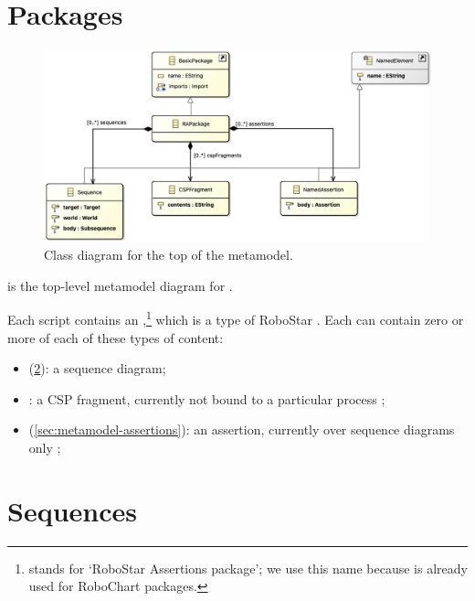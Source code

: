 
\section{Packages}\label{sec:metamodel-top}

\begin{figure}
	\centering
	\includegraphics[width=.85\textwidth]{diagrams/top.png}
	\caption{Class diagram for the top of the \langname{} metamodel.}
	\label{fig:metamodel-top}
\end{figure}

 is the top-level metamodel diagram for \langname.

Each \langname{} script contains an \mrapackage,\footnote{\mrapackage{} stands
for `RoboStar Assertions package'; we use this name because \mrcpackage{} is
already used for RoboChart packages.}
which is a type of RoboStar \mbasicpackage.
Each \mrapackage{} can contain zero or more of each of these types of content:

\begin{itemize}
\item
	\msequence{}
	(\cref{sec:metamodel-sequences}):
	a sequence diagram;
\item
	\mcspfragment:
	a CSP fragment, currently not bound to a particular process
	;
\item
	\massertion{}
	(\cref{sec:metamodel-assertions}):
	an assertion, currently over sequence diagrams only
	;
\end{itemize}



\section{Sequences}\label{sec:metamodel-sequences}

